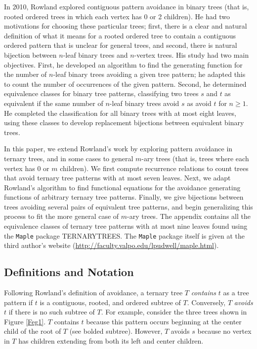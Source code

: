 \documentclass[12pt]{article}
\begin{document}
In 2010, Rowland \cite{Rowland10} explored contiguous pattern avoidance in binary trees (that is, rooted ordered trees in which each vertex has 0 or 2 children).  He had two motivations for choosing these particular trees; first, there is a clear and natural definition of what it means for a rooted ordered tree to contain a contiguous ordered pattern that is unclear for general trees, and second, there is natural bijection between $n$-leaf binary trees and $n$-vertex trees.  His study had two main objectives.  First, he developed an algorithm to find the generating function for the number of $n$-leaf binary trees avoiding a given tree pattern; he adapted this to count the number of occurrences of the given pattern.  Second, he determined equivalence classes for binary tree patterns, classifying two trees $s$ and $t$ as equivalent if the same number of $n$-leaf binary trees avoid $s$ as avoid $t$ for $n \geq 1$.  He completed the classification for all binary trees with at most eight leaves, using these classes to develop replacement bijections between equivalent binary trees.

In this paper, we extend Rowland's work by exploring pattern avoidance in ternary trees, and in some cases to general $m$-ary trees (that is, trees where each vertex has 0 or $m$ children).  We first compute recurrence relations to count trees that avoid ternary tree patterns with at most seven leaves.  Next, we adapt Rowland's algorithm to find functional equations for the avoidance generating functions of arbitrary ternary tree patterns.  Finally, we give bijections between trees avoiding several pairs of equivalent tree patterns, and begin generalizing this process to fit the more general case of $m$-ary trees.  The appendix contains all the equivalence classes of ternary tree patterns with at most nine leaves found using the \texttt{Maple} package TERNARYTREES.  The \texttt{Maple} package itself is given at the third author's website (\url{http://faculty.valpo.edu/lpudwell/maple.html}).

\subsection{Definitions and Notation}\label{S:Defs}

Following Rowland's definition of avoidance, a ternary tree $T$ \emph{contains} $t$ as a tree pattern if $t$ is a contiguous, rooted, and ordered subtree of $T$.  Conversely, $T$ \emph{avoids} $t$ if there is no such subtree of $T$.  For example, consider the three trees shown in Figure \ref{Feg1}.  $T$ contains $t$ because this pattern occurs beginning at the center child of the root of $T$ (see bolded subtree).  However, $T$ avoids $s$ because no vertex in $T$ has children extending from both its left and center children.
\end{document}
